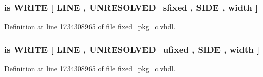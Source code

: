 \subsubsection[{bwrite}]{ {\bfseries \textcolor{keywordflow}{is}\textcolor{vhdlchar}{ }\textcolor{vhdlchar}{W\+R\+I\+T\+E}\textcolor{vhdlchar}{ }\textcolor{vhdlchar}{\mbox{[}}\textcolor{vhdlchar}{ }\textcolor{vhdlchar}{L\+I\+N\+E}\textcolor{vhdlchar}{ }\textcolor{vhdlchar}{,}\textcolor{vhdlchar}{ }{\bfseries {\bf U\+N\+R\+E\+S\+O\+L\+V\+E\+D\+\_\+sfixed}} \textcolor{vhdlchar}{ }\textcolor{vhdlchar}{,}\textcolor{vhdlchar}{ }\textcolor{vhdlchar}{S\+I\+D\+E}\textcolor{vhdlchar}{ }\textcolor{vhdlchar}{,}\textcolor{vhdlchar}{ }\textcolor{vhdlchar}{width}\textcolor{vhdlchar}{ }\textcolor{vhdlchar}{\mbox{]}}\textcolor{vhdlchar}{ }} \hspace{0.3cm}{\ttfamily [Alias]}}\label{classfixed__pkg_a72de5d43493c478c7a90063e495a4136}


Definition at line \hyperlink{fixed__pkg__c_8vhdl_source_l1734308965}{1734308965} of file \hyperlink{fixed__pkg__c_8vhdl_source}{fixed\+\_\+pkg\+\_\+c.\+vhdl}.

\hypertarget{classfixed__pkg_a8a3d70a8fa1aff7e05b3cb973c811353}{}
\subsubsection[{bwrite}]{ {\bfseries \textcolor{keywordflow}{is}\textcolor{vhdlchar}{ }\textcolor{vhdlchar}{W\+R\+I\+T\+E}\textcolor{vhdlchar}{ }\textcolor{vhdlchar}{\mbox{[}}\textcolor{vhdlchar}{ }\textcolor{vhdlchar}{L\+I\+N\+E}\textcolor{vhdlchar}{ }\textcolor{vhdlchar}{,}\textcolor{vhdlchar}{ }{\bfseries {\bf U\+N\+R\+E\+S\+O\+L\+V\+E\+D\+\_\+ufixed}} \textcolor{vhdlchar}{ }\textcolor{vhdlchar}{,}\textcolor{vhdlchar}{ }\textcolor{vhdlchar}{S\+I\+D\+E}\textcolor{vhdlchar}{ }\textcolor{vhdlchar}{,}\textcolor{vhdlchar}{ }\textcolor{vhdlchar}{width}\textcolor{vhdlchar}{ }\textcolor{vhdlchar}{\mbox{]}}\textcolor{vhdlchar}{ }} \hspace{0.3cm}{\ttfamily [Alias]}}\label{classfixed__pkg_a8a3d70a8fa1aff7e05b3cb973c811353}


Definition at line \hyperlink{fixed__pkg__c_8vhdl_source_l1734308965}{1734308965} of file \hyperlink{fixed__pkg__c_8vhdl_source}{fixed\+\_\+pkg\+\_\+c.\+vhdl}.

